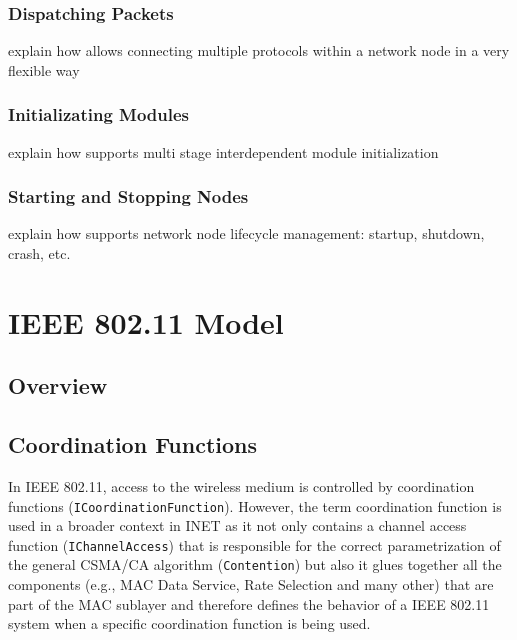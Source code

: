 %
\subsubsection*{Dispatching Packets}
%
explain how \inet allows connecting multiple protocols within a network node in a very flexible way


%
\subsubsection*{Initializating Modules}
%
explain how \inet supports multi stage interdependent module initialization


%
\subsubsection*{Starting and Stopping Nodes}
%
explain how \inet supports network node lifecycle management: startup, shutdown, crash, etc.


%
\section{IEEE 802.11 Model}
\label{sec:ieee-802.11}
%

\subsection{Overview}
\label{subsec:ieee-802.11-overview}
%

\subsection{Coordination Functions}
\label{subsec:ieee-802.11-coordination-functions}
%
In IEEE 802.11, access to the wireless medium is controlled by coordination functions (\texttt{ICoordinationFunction}). However, the term coordination function is used in a broader context in INET as it not only contains a channel access function (\texttt{IChannelAccess}) that is responsible for the correct parametrization of the general CSMA/CA algorithm (\texttt{Contention}) but also it glues together all the components (e.g., MAC Data Service, Rate Selection and many other) that are part of the MAC sublayer and therefore defines the behavior of a IEEE 802.11 system when a specific coordination function is being used.

